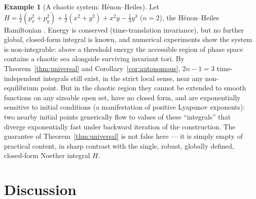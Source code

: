 \documentclass[11pt]{article}
\theoremstyle{definition}
\newtheorem{example}[theorem]{Example}
\theoremstyle{remark}
\begin{document}
\begin{example}[A chaotic system: H\'enon--Heiles]\label{ex:hh}
Let $H=\tfrac12(p_x^2+p_y^2)+\tfrac12(x^2+y^2)+x^2y-\tfrac13y^3$
($n=2$), the H\'enon--Heiles Hamiltonian \cite{henonheiles}. Energy is
conserved (time-translation invariance), but no further global,
closed-form integral is known, and numerical experiments show the system
is non-integrable: above a threshold energy the accessible region of phase
space contains a chaotic sea alongside surviving invariant tori. By
Theorem~\ref{thm:universal} and Corollary~\ref{cor:autonomous}, $2n-1=3$
time-independent integrals still exist, in the strict local sense, near any
non-equilibrium point. But in the chaotic region they cannot be extended to
smooth functions on any sizeable open set, have no closed form, and are
exponentially sensitive to initial conditions (a manifestation of positive
Lyapunov exponents): two nearby initial points generically flow to values
of these ``integrals'' that diverge exponentially fast under backward
iteration of the construction. The guarantee of Theorem~\ref{thm:universal}
is not false here --- it is simply empty of practical content, in sharp
contrast with the single, robust, globally defined, closed-form Noether
integral $H$.
\end{example}

\section{Discussion}\label{sec:discussion}
\end{document}
